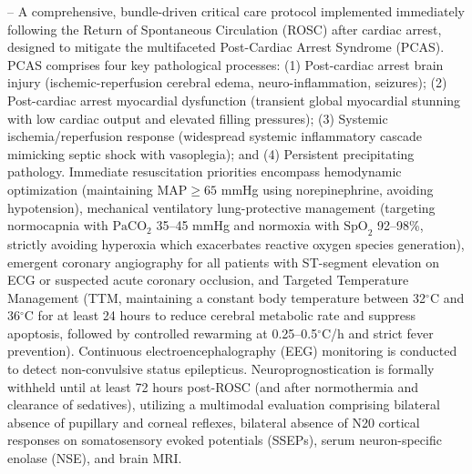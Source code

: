 -- A comprehensive, bundle-driven critical care protocol implemented immediately following the Return of Spontaneous Circulation (ROSC) after cardiac arrest, designed to mitigate the multifaceted Post-Cardiac Arrest Syndrome (PCAS). PCAS comprises four key pathological processes: (1) Post-cardiac arrest brain injury (ischemic-reperfusion cerebral edema, neuro-inflammation, seizures); (2) Post-cardiac arrest myocardial dysfunction (transient global myocardial stunning with low cardiac output and elevated filling pressures); (3) Systemic ischemia/reperfusion response (widespread systemic inflammatory cascade mimicking septic shock with vasoplegia); and (4) Persistent precipitating pathology. Immediate resuscitation priorities encompass hemodynamic optimization (maintaining $\text{MAP} \ge 65$ mmHg using norepinephrine, avoiding hypotension), mechanical ventilatory lung-protective management (targeting normocapnia with $\text{PaCO}_2$ 35--45 mmHg and normoxia with $\text{SpO}_2$ 92--98\%, strictly avoiding hyperoxia which exacerbates reactive oxygen species generation), emergent coronary angiography for all patients with ST-segment elevation on ECG or suspected acute coronary occlusion, and Targeted Temperature Management (TTM, maintaining a constant body temperature between 32$^\circ$C and 36$^\circ$C for at least 24 hours to reduce cerebral metabolic rate and suppress apoptosis, followed by controlled rewarming at 0.25--0.5$^\circ$C/h and strict fever prevention). Continuous electroencephalography (EEG) monitoring is conducted to detect non-convulsive status epilepticus. Neuroprognostication is formally withheld until at least 72 hours post-ROSC (and after normothermia and clearance of sedatives), utilizing a multimodal evaluation comprising bilateral absence of pupillary and corneal reflexes, bilateral absence of N20 cortical responses on somatosensory evoked potentials (SSEPs), serum neuron-specific enolase (NSE), and brain MRI.

